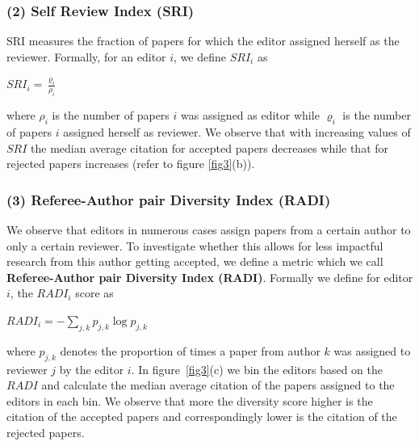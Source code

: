 \subsubsection*{ (2) Self Review Index (SRI)}
SRI measures the fraction of papers for which the editor assigned herself as the reviewer. 
Formally, for an editor $i$, we define $SRI_{i}$ as 
\begin{center}
$SRI_{i}=\frac{\varrho_{i}}{\rho_{i}}$
\end{center}
where $\rho_{i}$ is the number of papers $i$ was assigned as editor while $\varrho_{i}$ is the number of papers $i$ assigned herself as reviewer. We observe that with increasing values of $SRI$ the median average citation for accepted papers decreases while that for rejected papers increases (refer to figure \ref{fig3}(b)). 

\subsubsection*{(3) Referee-Author pair Diversity Index (RADI)}
We observe that editors in numerous cases assign papers from a certain author to only a certain reviewer. To investigate whether this allows for less impactful research from this author getting accepted, we define a metric which we call {\bf Referee-Author pair Diversity Index (RADI)}. Formally we define for editor $i$, the $RADI_{i}$ score as 

\begin{center}
$RADI_{i}=-\sum \limits_{j,k} p_{j,k} \log p_{j,k}$
\end{center}

where $p_{j,k}$ denotes the proportion of times a paper from author $k$ was assigned to reviewer $j$ by the editor $i$. In figure~\ref{fig3}(c) we bin the editors based on the $RADI$ and calculate the median average citation of the papers assigned to the editors in each bin. We observe that more the diversity score higher is the citation of the accepted papers and correspondingly lower is the citation of the rejected papers.



